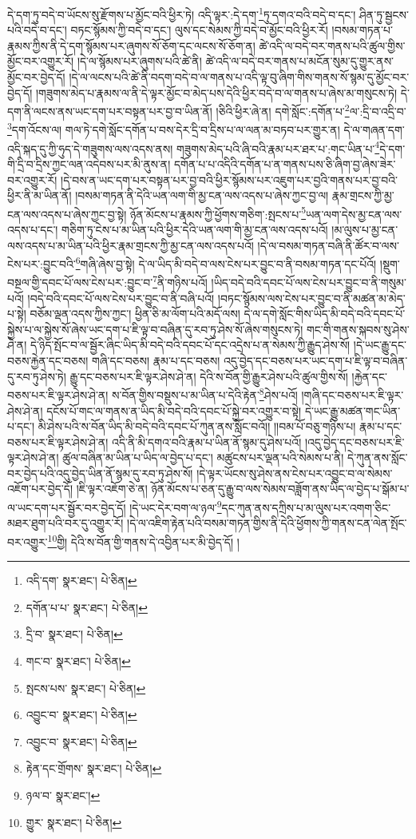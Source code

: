 དེ་དག་ཏུ་བདེ་བ་ཡོངས་སུ་རྫོགས་པ་མྱོང་བའི་ཕྱིར་ཏེ། འདི་ལྟར་:དེ་དག་\footnote{འདི་དག་  སྣར་ཐང་།  པེ་ཅིན། }ཏུ་དགའ་བའི་བདེ་བ་དང་། ཤིན་ཏུ་སྦྱངས་པའི་བདེ་བ་དང་། བཏང་སྙོམས་ཀྱི་བདེ་བ་དང་། ལུས་དང་སེམས་ཀྱི་བདེ་བ་མྱོང་བའི་ཕྱིར་རོ། །བསམ་གཏན་པ་རྣམས་ཀྱིས་ནི་དེ་དག་སྙོམས་པར་ཞུགས་སོ་ཅོག་དང་ལངས་སོ་ཅོག་ན། ཚེ་འདི་ལ་བདེ་བར་གནས་པའི་ཚུལ་གྱིས་མྱོང་བར་འགྱུར་རོ། །དེ་ལ་སྙོམས་པར་ཞུགས་པའི་ཚེ་ནི། ཚེ་འདི་ལ་བདེ་བར་གནས་པ་མངོན་སུམ་དུ་གྱུར་ནས་མྱོང་བར་བྱེད་དོ། །དེ་ལ་ལངས་པའི་ཚེ་ནི་བདག་བདེ་བ་ལ་གནས་པ་འདི་ལྟ་བུ་ཞིག་གིས་གནས་སོ་སྙམ་དུ་མྱོང་བར་བྱེད་དོ། །གཟུགས་མེད་པ་རྣམས་ལ་ནི་དེ་ལྟར་མྱོང་བ་མེད་པས་དེའི་ཕྱིར་བདེ་བ་ལ་གནས་པ་ཞེས་མ་གསུངས་ཏེ། དེ་དག་ནི་ལངས་ནས་ཡང་དག་པར་བསྟན་པར་བྱ་བ་ཡིན་ནོ། །ཅིའི་ཕྱིར་ཞེ་ན། དགེ་སློང་:དགོན་པ་\footnote{དགོན་པ་པ་  སྣར་ཐང་།  པེ་ཅིན། }ལ་:དྲི་བ་འདྲི་བ་\footnote{དྲི་བ་  སྣར་ཐང་།  པེ་ཅིན། }དག་འོངས་ལ། གལ་ཏེ་དགེ་སློང་དགོན་པ་བས་དེར་དྲི་བ་དྲིས་པ་ལ་ལན་མ་བཏབ་པར་གྱུར་ན། དེ་ལ་གཞན་དག་འདི་སྐད་དུ་ཀྱི་ཧུད་དེ་གཟུགས་ལས་འདས་ནས། གཟུགས་མེད་པའི་ཞི་བའི་རྣམ་པར་ཐར་པ་:གང་ཡིན་པ་\footnote{གང་བ་  སྣར་ཐང་།  པེ་ཅིན། }དེ་དག་གི་དྲི་བ་དྲིས་ཀྱང་ལན་འདེབས་པར་མི་ནུས་ན། དགོན་པ་པ་འདིའི་དགོན་པ་ན་གནས་པས་ཅི་ཞིག་བྱ་ཞེས་ཟེར་བར་འགྱུར་རོ། །དེ་བས་ན་ཡང་དག་པར་བསྟན་པར་བྱ་བའི་ཕྱིར་སྙོམས་པར་འཇུག་པར་བྱའི་གནས་པར་བྱ་བའི་ཕྱིར་ནི་མ་ཡིན་ནོ། །བསམ་གཏན་ནི་དེའི་ཡན་ལག་གི་མྱ་ངན་ལས་འདས་པ་ཞེས་ཀྱང་བྱ་ལ། རྣམ་གྲངས་ཀྱི་མྱ་ངན་ལས་འདས་པ་ཞེས་ཀྱང་བྱ་སྟེ། ཉོན་མོངས་པ་རྣམས་ཀྱི་ཕྱོགས་གཅིག་:སྤངས་པ་\footnote{སྤངས་པས་  སྣར་ཐང་།  པེ་ཅིན། }ཡན་ལག་དེས་མྱ་ངན་ལས་འདས་པ་དང་། གཅིག་ཏུ་ངེས་པ་མ་ཡིན་པའི་ཕྱིར་དེའི་ཡན་ལག་གི་མྱ་ངན་ལས་འདས་པའོ། །མ་ལུས་པ་མྱ་ངན་ལས་འདས་པ་མ་ཡིན་པའི་ཕྱིར་རྣམ་གྲངས་ཀྱི་མྱ་ངན་ལས་འདས་པའོ། །དེ་ལ་བསམ་གཏན་བཞི་ནི་ཚོར་བ་ལས་ངེས་པར་:བྱུང་བའི་\footnote{འབྱུང་བ་  སྣར་ཐང་།  པེ་ཅིན། }གཞི་ཞེས་བྱ་སྟེ། དེ་ལ་ཡིད་མི་བདེ་བ་ལས་ངེས་པར་བྱུང་བ་ནི་བསམ་གཏན་དང་པོའོ། །སྡུག་བསྔལ་གྱི་དབང་པོ་ལས་ངེས་པར་:བྱུང་བ་\footnote{འབྱུང་བ་  སྣར་ཐང་།  པེ་ཅིན། }ནི་གཉིས་པའོ། །ཡིད་བདེ་བའི་དབང་པོ་ལས་ངེས་པར་བྱུང་བ་ནི་གསུམ་པའོ། །བདེ་བའི་དབང་པོ་ལས་ངེས་པར་བྱུང་བ་ནི་བཞི་པའོ། །བཏང་སྙོམས་ལས་ངེས་པར་བྱུང་བ་ནི་མཚན་མ་མེད་པ་སྟེ། བཅོམ་ལྡན་འདས་ཀྱིས་ཀྱང་། ཕྱིན་ཅི་མ་ལོག་པའི་མདོ་ལས། དེ་ལ་དགེ་སློང་གིས་ཡིད་མི་བདེ་བའི་དབང་པོ་སྐྱེས་པ་ལ་སྐྱེས་སོ་ཞེས་ཡང་དག་པ་ཇི་ལྟ་བ་བཞིན་དུ་རབ་ཏུ་ཤེས་སོ་ཞེས་གསུངས་ཏེ། གང་གི་གནས་སྐབས་སུ་ཤེས་ཤེ་ན། དེ་ཉིད་སྤོང་བ་ལ་སྦྱོར་ཞིང་ཡིད་མི་བདེ་བའི་དབང་པོ་དང་འདྲེས་པ་ན་སེམས་ཀྱི་རྒྱུད་ཤེས་སོ། །དེ་ཡང་རྒྱུ་དང་བཅས་རྐྱེན་དང་བཅས། གཞི་དང་བཅས། རྣམ་པ་དང་བཅས། འདུ་བྱེད་དང་བཅས་པར་ཡང་དག་པ་ཇི་ལྟ་བ་བཞིན་དུ་རབ་ཏུ་ཤེས་ཏེ། རྒྱུ་དང་བཅས་པར་ཇི་ལྟར་ཤེས་ཤེ་ན། དེའི་ས་བོན་གྱི་རྒྱུར་ཤེས་པའི་ཚུལ་གྱིས་སོ། །རྐྱེན་དང་བཅས་པར་ཇི་ལྟར་ཤེས་ཤེ་ན། ས་བོན་གྱིས་བསྡུས་པ་མ་ཡིན་པ་དེའི་རྟེན་\footnote{རྟེན་དང་གྲོགས་  སྣར་ཐང་།  པེ་ཅིན། }ཤེས་པའོ། །གཞི་དང་བཅས་པར་ཇི་ལྟར་ཤེས་ཤེ་ན། དངོས་པོ་གང་ལ་གནས་ན་ཡིད་མི་བདེ་བའི་དབང་པོ་སྐྱེ་བར་འགྱུར་བ་སྟེ། དེ་ཡང་རྒྱུ་མཚན་གང་ཡིན་པ་དང་། མི་ཤེས་པའི་ས་བོན་ཡིད་མི་བདེ་བའི་དབང་པོ་ཀུན་ནས་སློང་བའོ།། །།བམ་པོ་བཅུ་གཉིས་པ། རྣམ་པ་དང་བཅས་པར་ཇི་ལྟར་ཤེས་ཤེ་ན། འདི་ནི་མི་དགའ་བའི་རྣམ་པ་ཡིན་ནོ་སྙམ་དུ་ཤེས་པའོ། །འདུ་བྱེད་དང་བཅས་པར་ཇི་ལྟར་ཤེས་ཤེ་ན། ཚུལ་བཞིན་མ་ཡིན་པ་ཡིད་ལ་བྱེད་པ་དང་། མཚུངས་པར་ལྡན་པའི་སེམས་པ་ནི། དེ་ཀུན་ནས་སློང་བར་བྱེད་པའི་འདུ་བྱེད་ཡིན་ནོ་སྙམ་དུ་རབ་ཏུ་ཤེས་སོ། །དེ་ལྟར་ཡོངས་སུ་ཤེས་ནས་ངེས་པར་འབྱུང་བ་ལ་སེམས་འཇོག་པར་བྱེད་དོ། །ཇི་ལྟར་འཇོག་ཅེ་ན། ཉོན་མོངས་པ་ཅན་དུ་རྒྱུ་བ་ལས་སེམས་བཟློག་ནས་ཡིད་ལ་བྱེད་པ་སྒོམ་པ་ལ་ཡང་དག་པར་སྦྱོར་བར་བྱེད་དོ། །དེ་ཡང་དེར་བག་ལ་ཉལ་\footnote{ཉལ་བ་  སྣར་ཐང་། }དང་ཀུན་ནས་དཀྲིས་པ་མ་ལུས་པར་འགག་ཅིང་མཐར་ཐུག་པའི་བར་དུ་འགྱུར་རོ། །དེ་ལ་འཇིག་རྟེན་པའི་བསམ་གཏན་གྱིས་ནི་དེའི་ཕྱོགས་ཀྱི་གནས་ངན་ལེན་སྤོང་བར་འགྱུར་\footnote{གྱུར་  སྣར་ཐང་།  པེ་ཅིན། }གྱི། དེའི་ས་བོན་གྱི་གནས་དེ་འབྱིན་པར་མི་བྱེད་དོ། །
